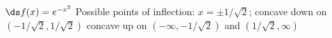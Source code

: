 {$\ds f(x) = e^{-x^2}$\label{exer:03_04_ex_28}
}
{Possible points of inflection: $x=\pm 1/\sqrt{2}$;
concave down on $(- 1/\sqrt{2}, 1/\sqrt{2})$
concave up on $(-\infty,- 1/\sqrt{2})$ and $( 1/\sqrt{2},\infty)$
}
